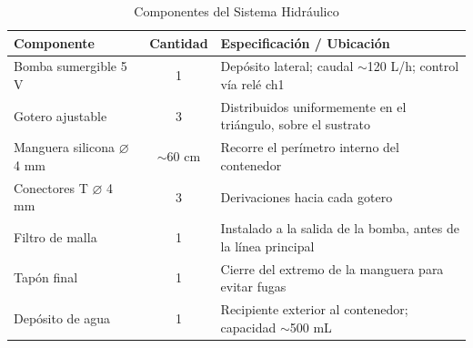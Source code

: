 \begin{table}[tp]
\centering
\renewcommand{\arraystretch}{1.3}
\caption{Componentes del Sistema Hidráulico}
\label{tab:componentes_hidraulicos}
\begin{tabularx}{\textwidth}{|l|c|X|}
\hline
\textbf{Componente} & \textbf{Cantidad} & \textbf{Especificación / Ubicación} \\
\hline
Bomba sumergible 5 V & 1 & Depósito lateral; caudal $\sim$120 L/h; control vía relé ch1 \\
\hline
Gotero ajustable & 3 & Distribuidos uniformemente en el triángulo, sobre el sustrato \\
\hline
Manguera silicona $\varnothing$ 4 mm & $\sim$60 cm & Recorre el perímetro interno del contenedor \\
\hline
Conectores T $\varnothing$ 4 mm & 3 & Derivaciones hacia cada gotero \\
\hline
Filtro de malla & 1 & Instalado a la salida de la bomba, antes de la línea principal \\
\hline
Tapón final & 1 & Cierre del extremo de la manguera para evitar fugas \\
\hline
Depósito de agua & 1 & Recipiente exterior al contenedor; capacidad $\sim$500 mL \\
\hline
\end{tabularx}
\end{table}